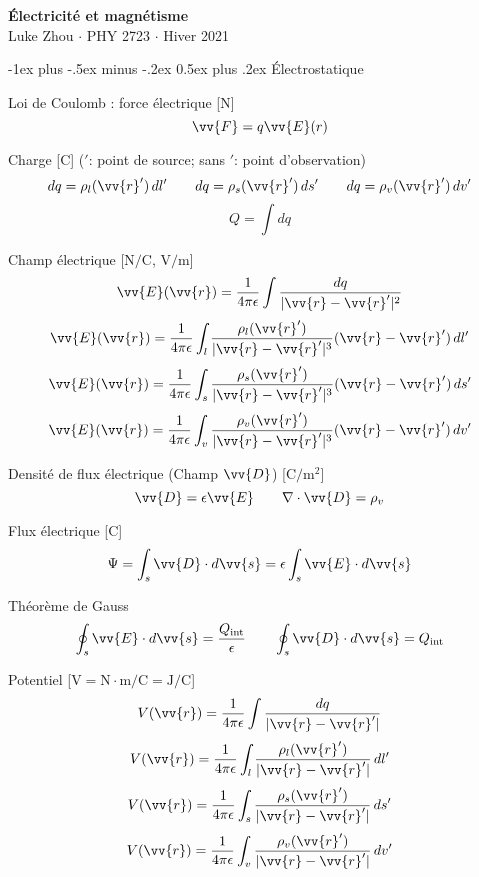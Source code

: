 \documentclass[10pt,landscape]{article}
\makeatletter
\renewcommand{\section}{\@startsection{section}{1}{0mm}%
                                {-1ex plus -.5ex minus -.2ex}%
                                {0.5ex plus .2ex}%
                                {\normalfont\large\bfseries}}
\newcommand{\uvec}[1]{\ensuremath{\boldsymbol{\hat{#1}}}}
\makeatother
\begin{document}
\raggedright
\footnotesize
\begin{multicols}{3}


\setlength{\premulticols}{1pt}
\setlength{\postmulticols}{1pt}
\setlength{\multicolsep}{1pt}
\setlength{\columnsep}{2pt}

\begin{center}
     \Large{\textbf{Électricité et magnétisme}} \\
     \small{Luke Zhou $\cdot$ PHY 2723 $\cdot$ Hiver 2021}
\end{center}

\section{Électrostatique}

Loi de Coulomb : force électrique [\si{\newton}]
 \[ \vv{F} = q\vv{E}(r) \] %

Charge  [\si{\coulomb}] ($'$: point de source; sans $'$: point d'observation)
\[  dq = \rho_l(\vv{r}') \,dl'  \qquad  dq = \rho_s(\vv{r}') \,ds'  \qquad dq = \rho_v(\vv{r}') \,dv'  \]
\[  Q = \int dq \]

Champ électrique [$\si{\newton/\coulomb}$, $\si{\volt/\metre}$]
\[ \vv{E}(\vv{r}) = \frac{1}{4\pi\epsilon} \int \frac{dq}{| \vv{r} - \vv{r}' |^2 }  \]
\[ \vv{E}(\vv{r}) = \frac{1}{4\pi\epsilon} \int_{l} \frac{\rho_l(\vv{r}')}{| \vv{r} - \vv{r}' |^3 } (\vv{r} - \vv{r}' )\,dl'  \]
%
\[\vv{E}(\vv{r}) = \frac{1}{4\pi\epsilon} \int_{s} \frac{\rho_s(\vv{r}')}{| \vv{r} - \vv{r}'|^3 } (\vv{r} - \vv{r}' )\,ds' \]
%
\[\vv{E}(\vv{r}) = \frac{1}{4\pi\epsilon} \int_{v} \frac{\rho_v(\vv{r}')}{| \vv{r} - \vv{r}' |^3 } (\vv{r} - \vv{r}' )\,dv'  \]

Densité de flux électrique (Champ $\vv{D}$)  [$\si{\coulomb/\metre^2}$]
\[ \vv{D} = \epsilon\vv{E}
\qquad \nabla \cdot \vv{D} = \rho_v \]

Flux électrique [\si{\coulomb}]
\[ \Psi = \int_{s} \vv{D} \cdot d\vv{s} = \epsilon \int_{s} \vv{E} \cdot d\vv{s} \]

Théorème de Gauss
\[ \oint_s \vv{E}\cdot d\vv{s} = \frac{Q_\text{int}}{\epsilon}
\qquad  \oint_s \vv{D}\cdot d\vv{s} = Q_\text{int} \]

Potentiel [$\si{\volt} = \si{\newton\cdot\metre/\coulomb} = \si{\joule/\coulomb}$]
\[ V(\vv{r}) = \frac{1}{4\pi\epsilon} \int \frac{dq}{| \vv{r} - \vv{r}' | }  \]
\[ {V}(\vv{r}) = \frac{1}{4\pi\epsilon} \int_{l} \frac{\rho_l(\vv{r}')}{| \vv{r} - \vv{r}' | } \,dl' \]
\[  {V}(\vv{r}) = \frac{1}{4\pi\epsilon} \int_{s} \frac{\rho_s(\vv{r}')}{| \vv{r} - \vv{r}'| } \,ds'  \]
%
\[ {V}(\vv{r}) = \frac{1}{4\pi\epsilon} \int_{v} \frac{\rho_v(\vv{r}')}{| \vv{r} - \vv{r}' | } \,dv'  \]


\end{multicols}
\end{document}
